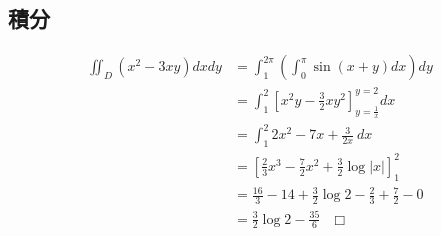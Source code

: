\documentclass[report,a4paper,titlepage]{jlreq}
\begin{document}
\subsection{積分}
\begin{align*}
    \iint_D (x^2-3xy)dxdy
     & = \int_1^{2\pi} \left(\int_0^{\pi}\sin(x+y)dx\right)dy                 \\
     & = \int_1^2 \left[x^2y-\frac{3}{2}xy^2\right]_{y=\frac{1}{x}}^{y=2} dx  \\
     & = \int_1^2 2x^2-7x+\frac{3}{2x}\ dx                                    \\
     & = \left[\frac{2}{3}x^3-\frac{7}{2}x^2+\frac{3}{2}\log|x|\right]_1^2    \\
     & = \frac{16}{3} - 14 +\frac{3}{2}\log 2 - \frac{2}{3} + \frac{7}{2} - 0 \\
     & =\frac{3}{2}\log 2 - \frac{35}{6} \quad□
\end{align*}
\end{document}
